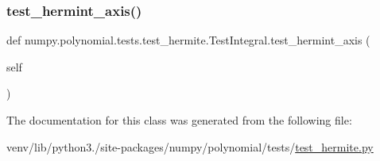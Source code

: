\mbox{\label{classnumpy_1_1polynomial_1_1tests_1_1test__hermite_1_1TestIntegral_a2e827d9987f65082b238746c4aaddbde}} 
\subsubsection{\texorpdfstring{test\+\_\+hermint\+\_\+axis()}{test\_hermint\_axis()}}
{\footnotesize\ttfamily def numpy.\+polynomial.\+tests.\+test\+\_\+hermite.\+Test\+Integral.\+test\+\_\+hermint\+\_\+axis (\begin{DoxyParamCaption}\item[{}]{self }\end{DoxyParamCaption})}



The documentation for this class was generated from the following file\+:\begin{DoxyCompactItemize}
\item 
venv/lib/python3./site-\/packages/numpy/polynomial/tests/\hyperlink{test__hermite_8py}{test\+\_\+hermite.\+py}\end{DoxyCompactItemize}
